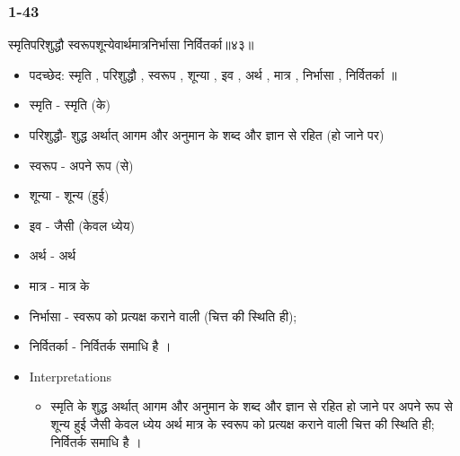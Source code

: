 \begin{frame}[fragile]\frametitle{1-43}
\begin{sanskrit}
स्मृतिपरिशुद्धौ स्वरूपशून्येवार्थमात्रनिर्भासा निर्वितर्का॥४३॥
\end{sanskrit}

	\begin{itemize}
	\item पदच्छेद: स्मृति , परिशुद्धौ , स्वरूप , शून्या , इव , अर्थ , मात्र , निर्भासा , निर्वितर्का ॥
	\item स्मृति - स्मृति (के)
	\item परिशुद्धौ- शुद्ध अर्थात् आगम और अनुमान के शब्द और ज्ञान से रहित (हो जाने पर)
	\item स्वरूप - अपने रूप (से)
	\item शून्या - शून्य (हुई)
	\item इव - जैसी (केवल ध्येय)
	\item अर्थ - अर्थ
	\item मात्र - मात्र के
	\item निर्भासा - स्वरूप को प्रत्यक्ष कराने वाली (चित्त की स्थिति ही);
	\item निर्वितर्का - निर्वितर्क समाधि है ।
	\item Interpretations
		\begin{itemize}
		\item स्मृति के शुद्ध अर्थात् आगम और अनुमान के शब्द और ज्ञान से रहित हो जाने पर अपने रूप से शून्य हुई जैसी केवल ध्येय अर्थ मात्र के स्वरूप को प्रत्यक्ष कराने वाली चित्त की स्थिति ही; निर्वितर्क समाधि है ।
		\end{itemize}
	\end{itemize}
	
\end{frame}


